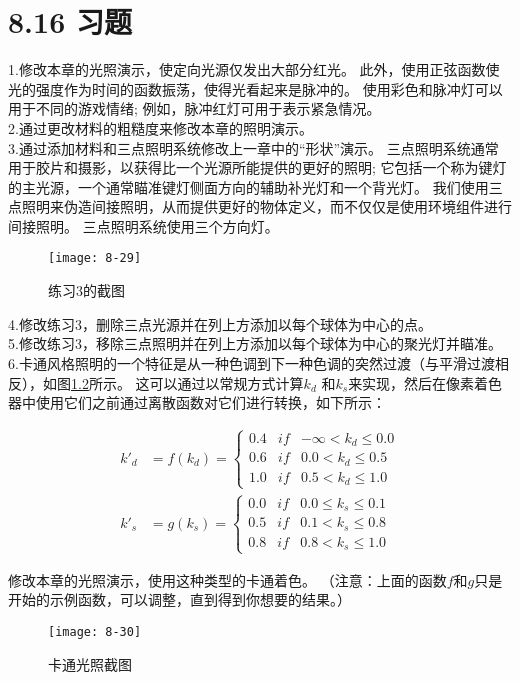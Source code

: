\chapter{8.16 习题}
\begin{flushleft}
1.修改本章的光照演示，使定向光源仅发出大部分红光。 此外，使用正弦函数使光的强度作为时间的函数振荡，使得光看起来是脉冲的。 使用彩色和脉冲灯可以用于不同的游戏情绪; 例如，脉冲红灯可用于表示紧急情况。\\

2.通过更改材料的粗糙度来修改本章的照明演示。\\
3.通过添加材料和三点照明系统修改上一章中的“形状”演示。 三点照明系统通常用于胶片和摄影，以获得比一个光源所能提供的更好的照明; 它包括一个称为键灯的主光源，一个通常瞄准键灯侧面方向的辅助补光灯和一个背光灯。 我们使用三点照明来伪造间接照明，从而提供更好的物体定义，而不仅仅是使用环境组件进行间接照明。 三点照明系统使用三个方向灯。\\
\end{flushleft}

\begin{figure}[h]
    \texttt{[image: 8-29]}
    \centering
    \caption{练习3的截图}
    \label{fig:8-29}
\end{figure}

\begin{flushleft}
4.修改练习3，删除三点光源并在列上方添加以每个球体为中心的点。\\
5.修改练习3，移除三点照明并在列上方添加以每个球体为中心的聚光灯并瞄准。\\
6.卡通风格照明的一个特征是从一种色调到下一种色调的突然过渡（与平滑过渡相反），如图\ref{fig:8-30}所示。 这可以通过以常规方式计算$k_{d}$ 和$k_{s}$来实现，然后在像素着色器中使用它们之前通过离散函数对它们进行转换，如下所示：\\
\end{flushleft}

\begin{align*}
k'_{d}&=f(k_{d})=\left\{\begin{matrix}
0.4 & if & -\infty < k_{d} \leq 0.0 \\ 
0.6 & if & 0.0 < k_{d} \leq 0.5 \\
1.0 & if & 0.5 < k_{d} \leq 1.0 
\end{matrix}\right. \\

k'_{s}&=g(k_{s})=\left\{\begin{matrix}
0.0 & if & 0.0 \leq k_{s} \leq 0.1 \\ 
0.5 & if & 0.1 < k_{s} \leq 0.8 \\
0.8 & if & 0.8 < k_{s} \leq 1.0 
\end{matrix}\right.
\end{align*}

\begin{flushleft}
修改本章的光照演示，使用这种类型的卡通着色。 （注意：上面的函数$f$和$g$只是开始的示例函数，可以调整，直到得到你想要的结果。）
\end{flushleft}

\begin{figure}[h]
    \texttt{[image: 8-30]}
    \centering
    \caption{卡通光照截图}
    \label{fig:8-30}
\end{figure}